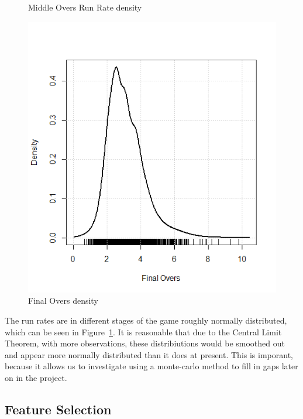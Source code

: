\begin{figure}
      \caption{Middle Overs Run Rate density}
    \endminipage\hfill
      \includegraphics[width=\linewidth]{figures/finaloversdens.png}
      \caption{Final Overs density}
    \endminipage
    \label{rrDensities}
\end{figure}

The run rates are  in different stages of the game roughly normally distributed, which can be seen in Figure~\ref{rrDensities}. It is reasonable that due to the Central Limit Theorem, with more observations, these distribiutions would be smoothed out and 
appear more normally distributed than it does at present. This is imporant, because it allows us to investigate using a monte-carlo method to fill in gaps 
later on in the project.

\subsection{Feature Selection}
\label{lassoSec}

